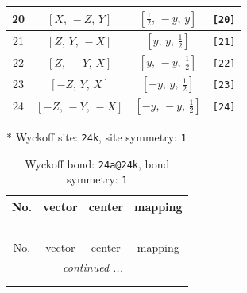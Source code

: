 \documentclass[fleqn,8pt]{jsarticle}
\begin{document}
\begin{longtable}{cccc}
20 & $\left[ X,\, - Z,\, Y \right]$ & $\left[ \frac{1}{2},\, - y,\, y \right]$ & {\tt [20]} \\ \hline
21 & $\left[ Z,\, Y,\, - X \right]$ & $\left[ y,\, y,\, \frac{1}{2} \right]$ & {\tt [21]} \\ \hline
22 & $\left[ Z,\, - Y,\, X \right]$ & $\left[ y,\, - y,\, \frac{1}{2} \right]$ & {\tt [22]} \\ \hline
23 & $\left[ - Z,\, Y,\, X \right]$ & $\left[ - y,\, y,\, \frac{1}{2} \right]$ & {\tt [23]} \\ \hline
24 & $\left[ - Z,\, - Y,\, - X \right]$ & $\left[ - y,\, - y,\, \frac{1}{2} \right]$ & {\tt [24]} \\
\end{longtable}
* Wyckoff site: {\tt 24k}, site symmetry: {\tt 1}
\renewcommand{\arraystretch}{1.2}
\begin{longtable}{cccc}
\caption{Wyckoff bond: {\tt 24a@24k}, bond symmetry: {\tt 1}}
 \\
 \hline \hline
No. & vector & center & mapping \\ \hline \endfirsthead

\multicolumn{3}{l}{\tablename\ \thetable{}} \\
 \hline \hline
No. & vector & center & mapping \\ \hline \endhead

 \hline \hline
\multicolumn{3}{r}{\footnotesize\it continued ...} \\ \endfoot

 \hline \hline
\multicolumn{3}{r}{} \\ \endlastfoot


\end{longtable}
\end{document}
